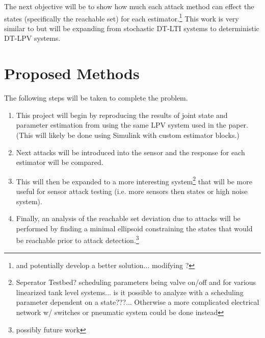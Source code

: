 \documentclass[]{article}
\begin{document}

The next objective will be to show how much each attack method can effect the states (specifically the reachable set) for each estimator.\footnote{and potentially develop a better solution... modifying \cite{securestateestimation}?} This work is very similar to \cite{hashemi2018comparison} but will be expanding from stochastic DT-LTI systems to deterministic DT-LPV systems.

\section{Proposed Methods}
The following steps will be taken to complete the problem.

\begin{enumerate}
	\item This project will begin by reproducing the results of joint state and parameter estimation from \cite{beelen2017joint} using the same LPV system used in the paper. (This will likely be done using Simulink with custom estimator blocks.)
	\item Next attacks will be introduced into the sensor and the response for each estimator will be compared.
	\item This will then be expanded to a more interesting system\footnote{Seperator Testbed? scheduling parameters being valve on/off and for various linearized tank level systems... is it possible to analyze with a scheduling parameter dependent on a state???... Otherwise a more complicated electrical network w/ switches or pneumatic system could be done instead} that will be more useful for sensor attack testing (i.e. more sensors then states or high noise system).
	\item Finally, an analysis of the reachable set deviation due to attacks will be performed by finding a minimal ellipsoid constraining the states that would be reachable prior to attack detection.\footnote{possibly future work}
\end{enumerate}

\newpage


\end{document}
